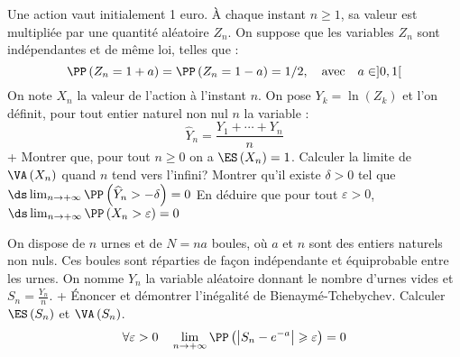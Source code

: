 \begin{exercise}
Une action vaut initialement 1 euro. À chaque instant $n \geqslant 1$, sa valeur est multipliée par une quantité aléatoire $Z_{n} $. On suppose que les variables $Z_{n}$ sont indépendantes et de même loi, telles que :
\begin{equation*}
\PP\left(Z_{n}=1+a\right)=\PP\left(Z_{n}=1-a\right)=1 / 2, \quad \text{avec}\quad a \in]0,1[
\end{equation*}
On note $X_{n}$ la valeur de l'action à l'instant $n$. On pose $Y_{k}=\ln \left(Z_{k}\right)$ et l'on définit, pour tout entier naturel non nul $n$ la variable :
\begin{equation*}
\widehat{Y}_{n}=\frac{Y_{1}+\cdots+Y_{n}}{n}
\end{equation*}
\question+ Montrer que, pour tout $n \geqslant 0$ on a $\ES\left(X_{n}\right)=1$.
\question Calculer la limite de $\VA\left(X_{n}\right)$ quand $n$ tend vers l'infini?
\question Montrer qu'il existe $\delta>0$ tel que
$\ds\lim _{n \rightarrow+\infty} \PP\left(\widehat{Y}_{n}>-\delta\right)=0$
\question En déduire que pour tout $\varepsilon>0$,
$\ds\lim _{n \rightarrow+\infty} \PP\left(X_{n}>\varepsilon\right)=0$
\endquestions 
\end{exercise}

\begin{exercise}[title=Centrale 2015]
On dispose de $n$ urnes et de $N=n a$ boules, où $a$ et $n$ sont des entiers naturels non nuls. Ces boules sont réparties de façon indépendante et équiprobable entre les urnes. On nomme $Y_{n}$ la variable aléatoire donnant le nombre d'urnes vides et $S_{n}=\frac{Y_{n}}{n}$.
\question+ Énoncer et démontrer l'inégalité de Bienaymé-Tchebychev.
\question Calculer $\ES\left(S_{n}\right)$ et $\VA\left(S_{n}\right)$.
\question 
\begin{equation*}[Montrer :]
\forall \varepsilon>0 \quad \lim _{n \rightarrow+\infty} \PP\left(\left|S_{n}-e^{-a}\right| \geqslant \varepsilon\right)=0
\end{equation*}
\endquestions 
\end{exercise}


